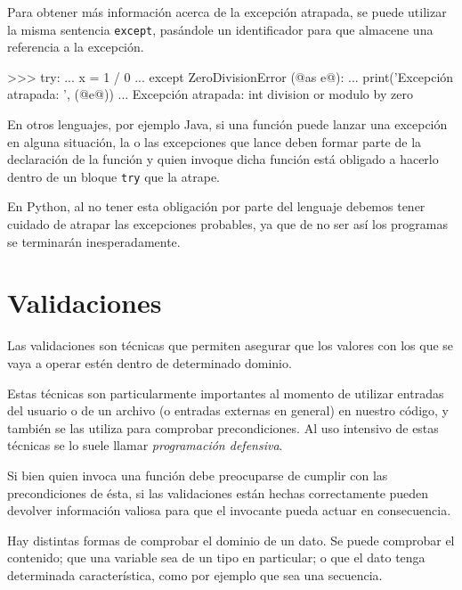 Para obtener más información acerca de la excepción atrapada, se puede utilizar
la misma sentencia \lstinline!except!, pasándole un identificador para que
almacene una referencia a la excepción.

\begin{codigo-python-sn}
>>> try:
...     x = 1 / 0
... except ZeroDivisionError (@as e@):
...     print('Excepción atrapada: ', (@e@))
...
Excepción atrapada: int division or modulo by zero
\end{codigo-python-sn}


\begin{sabias_que}
En otros lenguajes, por ejemplo Java, si una función puede lanzar una
excepción en alguna situación, la o las excepciones que lance deben formar
parte de la declaración de la función y quien invoque dicha función está
obligado a hacerlo dentro de un bloque \lstinline!try! que la atrape.

En Python, al no tener esta obligación por parte del lenguaje debemos tener
cuidado de atrapar las excepciones probables, ya que de no ser así los
programas se terminarán inesperadamente.
\end{sabias_que}

\section{Validaciones}

Las validaciones son técnicas que permiten asegurar que los valores con los
que se vaya a operar estén dentro de determinado dominio.

Estas técnicas son particularmente importantes al momento de utilizar entradas
del usuario o de un archivo (o entradas externas en general) en nuestro
código, y también se las utiliza para comprobar precondiciones. Al
uso intensivo de estas técnicas se lo suele llamar {\it programación
defensiva}.

Si bien quien invoca una función debe preocuparse de cumplir con las
precondiciones de ésta, si las validaciones están hechas correctamente pueden
devolver información valiosa para que el invocante pueda actuar en
consecuencia.

Hay distintas formas de comprobar el dominio de un dato. Se puede comprobar
el contenido; que una variable sea de un tipo en particular; o que el dato
tenga determinada característica, como por ejemplo que sea una secuencia.

